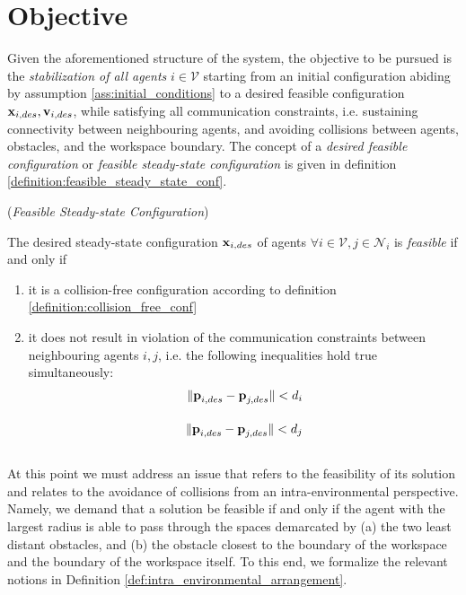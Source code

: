 \section{Objective}
\label{sec:objective}

Given the aforementioned structure of the system, the objective to be
pursued is the \textit{stabilization of all agents} $i \in \mathcal{V}$ starting
from an initial configuration abiding by assumption
\eqref{ass:initial_conditions} to a desired feasible configuration
$\bm{\mathbf{x}}_{i,des}, \bm{\mathbf{v}}_{i,des}$, while
satisfying all communication constraints, i.e. sustaining connectivity between
neighbouring agents, and avoiding collisions between agents, obstacles, and the
workspace boundary. The concept of a \textit{desired feasible configuration}
or \textit{feasible steady-state configuration} is given in definition
\eqref{definition:feasible_steady_state_conf}.

\begin{bw_box}
\begin{definition} (\textit{Feasible Steady-state Configuration})
\label{definition:feasible_steady_state_conf}

The desired steady-state configuration $\bm{\mathbf{x}}_{i,des}$ of agents
$\forall i \in \mathcal{V}, j \in \mathcal{N}_i$ is \textit{feasible} if and
only if
\begin{enumerate}
  \item it is a collision-free configuration according to definition
    \eqref{definition:collision_free_conf}
  \item it does not result in violation of the communication constraints
    between neighbouring agents $i,j$, i.e. the following inequalities hold
    true simultaneously:
    \begin{align}
      \|\bm{\mathbf{p}}_{i,des} - \bm{\mathbf{p}}_{j,des}\| < d_i \\[2.5ex]
      \|\bm{\mathbf{p}}_{i,des} - \bm{\mathbf{p}}_{j,des}\| < d_j \\[2.5ex]
    \end{align}
\end{enumerate}

\end{definition}
\end{bw_box}

At this point we must address an issue
that refers to the feasibility of its solution and relates to the avoidance of
collisions from an intra-environmental perspective. Namely, we demand that a
solution be feasible if and only if the agent with the largest radius is able to
pass through the spaces demarcated by (a) the two least distant obstacles,
and (b) the obstacle closest to the boundary of the workspace and the
boundary of the workspace itself. To this end, we formalize the relevant notions
in Definition \eqref{def:intra_environmental_arrangement}. \\[2.5ex]

